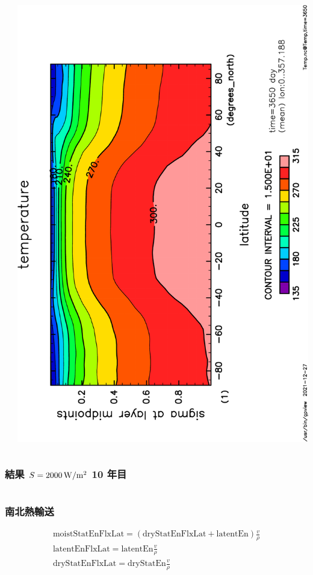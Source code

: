 \documentclass[aspectratio=149,9pt,fleqn]{beamer}
\begin{document}
\begin{frame}
\begin{columns}[T]
\begin{column}{.4\textwidth}
		\end{column}
		\begin{column}{.4\textwidth}
			\includegraphics[height=\textwidth,angle=-90]{S1800Temp,time=3650-crop.pdf}
		\end{column}
	\end{columns}
\end{frame}

\begin{frame}
	\frametitle{結果 \(S=2000\hmu{W/m^2}\) 10 年目}
	\begin{columns}[T]
		\begin{column}{.4\textwidth}
		\end{column}
		\begin{column}{.4\textwidth}
		\end{column}
	\end{columns}
\end{frame}

\begin{frame}
	\frametitle{南北熱輸送}
	\begin{gather*}
		\mathrm{moistStatEnFlxLat}=(\mathrm{dryStatEnFlxLat}+\mathrm{latentEn})\frac{v}{\rho}\\
		\mathrm{latentEnFlxLat}=\mathrm{latentEn}\frac{v}{\rho}\\
		\mathrm{dryStatEnFlxLat}=\mathrm{dryStatEn}\frac{v}{\rho}
	\end{gather*}
\end{frame}
\end{document}
